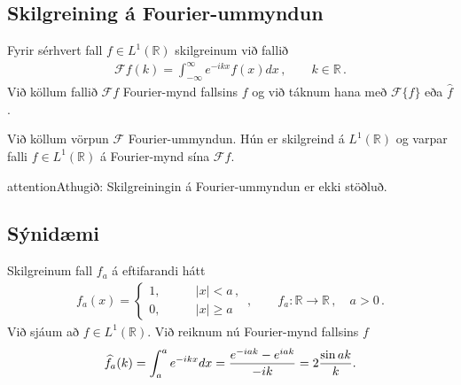 \documentclass[a4paper,10pt,icelandic]{sphinxmanual}
\begin{document}
\subsection{Skilgreining á Fourier-ummyndun}
\label{\detokenize{Kafli04:skilgreining-a-fourier-ummyndun}}
Fyrir sérhvert fall \(f \in L^1(\mathbb R)\) skilgreinum við fallið
\begin{equation*}
\begin{split}\mathcal{F} f(k) = \int_{-\infty}^\infty e^{-i k x} f(x)dx\,, \qquad k \in\mathbb{R}\,.\end{split}
\end{equation*}
Við köllum fallið \(\mathcal{F} f\) Fourier-mynd fallsins \(f\) og við táknum hana með \(\mathcal{F}\{f\}\) eða \(\widehat{f}\).

Við köllum vörpun \(\mathcal{F}\) Fourier-ummyndun.
Hún er skilgreind á \(L^1(\mathbb R)\) og varpar falli \(f\in L^1(\mathbb R)\) á Fourier-mynd sína \(\mathcal{F} f\).

\begin{sphinxadmonition}{attention}{Athugið:}
Skilgreiningin á Fourier-ummyndun er ekki stöðluð.
\end{sphinxadmonition}


\subsection{Sýnidæmi}
\label{\detokenize{Kafli04:synidaemi}}
Skilgreinum fall \(f_a\) á eftifarandi hátt
\begin{equation*}
\begin{split}f_a (x) = \begin{cases} 1, \qquad &|x|<a\,, \\ 0, \qquad & |x|\ge a \,  \end{cases} \,, \qquad f_a : \mathbb{R}\to \mathbb{R}\,,\quad a>0\,.\end{split}
\end{equation*}
Við sjáum að \(f \in L^1(\mathbb R)\). Við reiknum nú Fourier-mynd fallsins \(f\)
\begin{equation*}
\begin{split}\widehat{f}_a(k)=\int_a^a e^{-i k x} dx= {e^{-i a k}-e^{i a k}\over -i k}=2 {\sin a k\over k}.\end{split}
\end{equation*}
\end{document}

